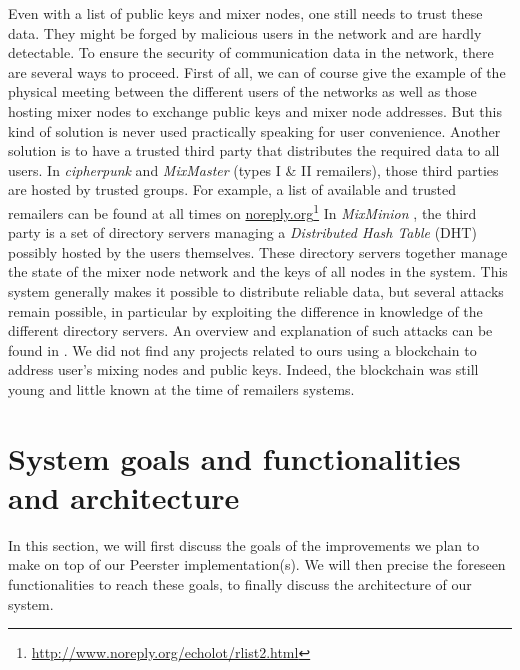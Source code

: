 \documentclass[11pt, a4paper]{article}
\begin{document}
        Even with a list of public keys and mixer nodes, one still needs to trust these data.
        They might be forged by malicious users in the network and are hardly detectable.
        To ensure the security of communication data in the network, there are several ways to proceed.
        First of all, we can of course give the example of the physical meeting between the different users of the networks as well as those hosting mixer nodes to exchange public keys and mixer node addresses.
        But this kind of solution is never used practically speaking for user convenience.
        Another solution is to have a trusted third party that distributes the required data to all users.
        In \textit{cipherpunk} and \textit{MixMaster} (types I \& II remailers), those third parties are hosted by trusted groups.
        For example, a list of available and trusted remailers can be found at all times on \url{noreply.org}\footnote{\url{http://www.noreply.org/echolot/rlist2.html}}
        \bigbreak
        In \textit{MixMinion} \cite{mixminion}, the third party is a set of directory servers managing a \textit{Distributed Hash Table} (DHT) possibly hosted by the users themselves.
        These directory servers together manage the state of the mixer node network and the keys of all nodes in the system.
        This system generally makes it possible to distribute reliable data, but several attacks remain possible, in particular by exploiting the difference in knowledge of the different directory servers.
        An overview and explanation of such attacks can be found in \cite[Section 6]{mixminion}.
        \bigbreak
        We did not find any projects related to ours using a blockchain to address user's mixing nodes and public keys.
        Indeed, the blockchain was still young and little known at the time of remailers systems.


\section{System goals and functionalities and architecture}

    In this section, we will first discuss the goals of the improvements we plan to make on top of our Peerster implementation(s).
    We will then precise the foreseen functionalities to reach these goals, to finally discuss the architecture of our system.
\end{document}
